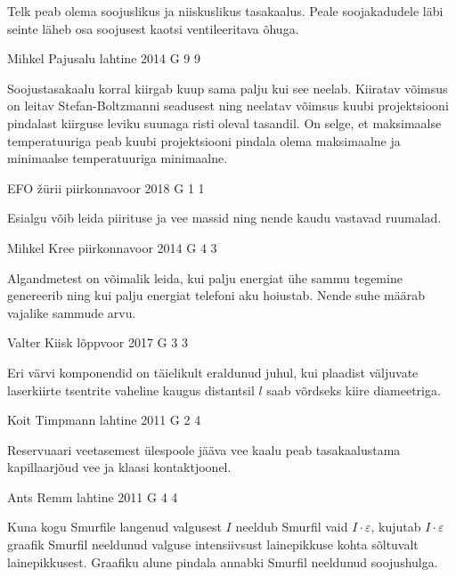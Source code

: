 \documentclass[11pt, twoside]{article}
\begin{document}
{{\ifHint
Telk peab olema soojuslikus ja niiskuslikus tasakaalus. Peale soojakadudele läbi seinte läheb osa soojusest kaotsi ventileeritava õhuga.
\fi
}

{Mihkel Pajusalu} %
{lahtine} %
{2014} %
{G 9} %
{9} %
{

\ifHint
Soojustasakaalu korral kiirgab kuup sama palju kui see neelab. Kiiratav võimsus on leitav Stefan-Boltzmanni seadusest ning neelatav võimsus kuubi projektsiooni pindalast kiirguse leviku suunaga risti oleval tasandil. On selge, et maksimaalse temperatuuriga peab kuubi projektsiooni pindala olema maksimaalne ja minimaalse temperatuuriga minimaalne.
\fi
}

{EFO žürii} %
{piirkonnavoor} %
{2018} %
{G 1} %
{1} %
{

\ifHint
Esialgu võib leida piirituse ja vee massid ning nende kaudu vastavad ruumalad.
\fi
}

{Mihkel Kree} %
{piirkonnavoor} %
{2014} %
{G 4} %
{3} %
{

\ifHint
Algandmetest on võimalik leida, kui palju energiat ühe sammu tegemine genereerib ning kui palju energiat telefoni aku hoiustab. Nende suhe määrab vajalike sammude arvu.
\fi
}

{Valter Kiisk} %
{lõppvoor} %
{2017} %
{G 3} %
{3} %
{

\ifHint
Eri värvi komponendid on täielikult eraldunud juhul, kui plaadist väljuvate laserkiirte tsentrite vaheline kaugus distantsil $l$ saab võrdseks kiire diameetriga.
\fi
}

{Koit Timpmann} %
{lahtine} %
{2011} %
{G 2} %
{4} %
{

\ifHint
Reservuaari veetasemest ülespoole jääva vee kaalu peab tasakaalustama kapillaarjõud vee ja klaasi kontaktjoonel.
\fi
}

{Ants Remm} %
{lahtine} %
{2011} %
{G 4} %
{4} %
{

\ifHint
Kuna kogu Smurfile langenud valgusest $I$ neeldub Smurfil vaid $ I \cdot\varepsilon $, kujutab $ I \cdot \varepsilon $ graafik Smurfil neeldunud valguse intensiivsust lainepikkuse kohta sõltuvalt lainepikkusest. Graafiku alune pindala annabki Smurfil neeldunud soojushulga. 
\fi
}

}
\end{document}
